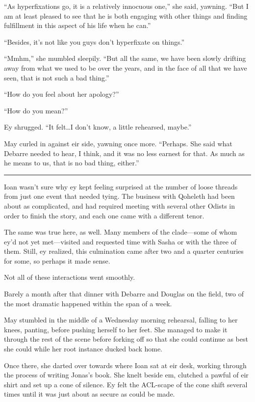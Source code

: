 ``As hyperfixations go, it is a relatively innocuous one,'' she said, yawning. ``But I am at least pleased to see that he is both engaging with other things and finding fulfillment in this aspect of his life when he can.''

``Besides, it's not like you guys don't hyperfixate on things.''

``Mmhm,'' she mumbled sleepily. ``But all the same, we have been slowly drifting away from what we used to be over the years, and in the face of all that we have seen, that is not such a bad thing.''

``How do you feel about her apology?''

``How do you mean?''

Ey shrugged. ``It felt\ldots I don't know, a little rehearsed, maybe.''

May curled in against eir side, yawning once more. ``Perhaps. She said what Debarre needed to hear, I think, and it was no less earnest for that. As much as he means to us, that is no bad thing, either.''

\begin{center}\rule{0.5\linewidth}{0.5pt}\end{center}

Ioan wasn't sure why ey kept feeling surprised at the number of loose threads from just one event that needed tying. The business with Qoheleth had been about as complicated, and had required meeting with several other Odists in order to finish the story, and each one came with a different tenor.

The same was true here, as well. Many members of the clade—some of whom ey'd not yet met—visited and requested time with Sasha or with the three of them. Still, ey realized, this culmination came after two and a quarter centuries for some, so perhaps it made sense.

Not all of these interactions went smoothly.

Barely a month after that dinner with Debarre and Douglas on the field, two of the most dramatic happened within the span of a week.

May stumbled in the middle of a Wednesday morning rehearsal, falling to her knees, panting, before pushing herself to her feet. She managed to make it through the rest of the scene before forking off so that she could continue as best she could while her root instance ducked back home.

Once there, she darted over towards where Ioan sat at eir desk, working through the process of writing Jonas's book. She knelt beside em, clutched a pawful of eir shirt and set up a cone of silence. Ey felt the ACL-scape of the cone shift several times until it was just about as secure as could be made.

